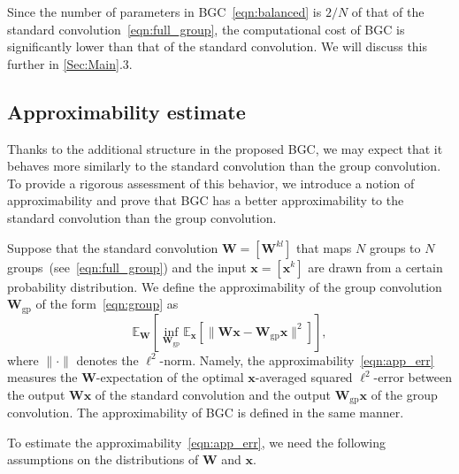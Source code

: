 \documentclass[preprint,12pt,authoryear]{elsarticle}
\numberwithin{equation}{section}
\theoremstyle{remark}
\newcommand\bW{\mathbf{W}}
\newcommand\bx{\mathbf{x}}
\newcommand\bbE{\mathbb{E}}
\newcommand\gp{\mathrm{gp}}
\begin{document}
Since the number of parameters in BGC~\eqref{eqn:balanced} is $2/N$ of that of the standard convolution~\eqref{eqn:full_group}, the computational cost of BGC is significantly lower than that of the standard convolution. We will discuss this further in \cref{Sec:Main}.3.

\subsection{Approximability estimate}
Thanks to the additional structure in the proposed BGC, we may expect that it behaves more similarly to the standard convolution than the group convolution.
To provide a rigorous assessment of this behavior, we introduce a notion of approximability and prove that BGC has a better approximability to the standard convolution than the group convolution.

Suppose that the standard convolution $\bW = [\bW^{kl}]$ that maps $N$ groups to $N$ groups~(see~\eqref{eqn:full_group}) and the input $\bx = [\bx^k]$ are drawn from a certain probability distribution.
We define the approximability of the group convolution $\bW_{\gp}$ of the form~\eqref{eqn:group} as
\begin{equation}
    \label{eqn:app_err}
    \bbE_{\bW} \left[ \inf_{\bW_{\gp}} \bbE_{\bx} \left[ \| \bW \bx - \bW_{\gp} \bx \|^2 \right] \right],
\end{equation}
where $\| \cdot \|$ denotes the $\ell^2$-norm.
Namely, the approximability~\eqref{eqn:app_err} measures the $\bW$-expectation of the optimal $\bx$-averaged squared $\ell^2$-error between the output $\bW \bx$ of the standard convolution and the output $\bW_{\gp} \bx$ of the group convolution.
The approximability of BGC is defined in the same manner.

To estimate the approximability~\eqref{eqn:app_err}, we need the following assumptions on the distributions of $\bW$ and $\bx$.
\end{document}
